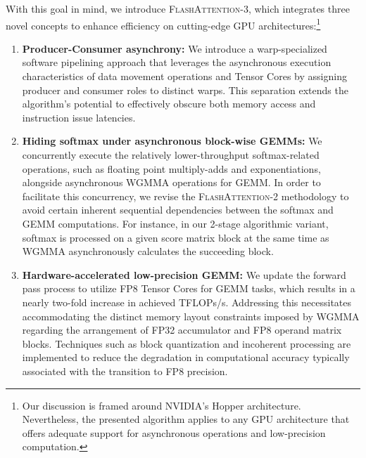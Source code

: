 With this goal in mind, we introduce \textsc{FlashAttention-3}, which integrates three novel concepts to enhance efficiency on cutting-edge GPU architectures:\footnote{Our discussion is framed around NVIDIA's Hopper architecture. Nevertheless, the presented algorithm applies to any GPU architecture that offers adequate support for asynchronous operations and low-precision computation.}

\begin{enumerate}

\item \textbf{Producer-Consumer asynchrony:} We introduce a warp-specialized software pipelining approach that leverages the asynchronous execution characteristics of data movement operations and Tensor Cores by assigning producer and consumer roles to distinct warps. This separation extends the algorithm’s potential to effectively obscure both memory access and instruction issue latencies.

\item \textbf{Hiding softmax under asynchronous block-wise GEMMs:} We concurrently execute the relatively lower-throughput softmax-related operations, such as floating point multiply-adds and exponentiations, alongside asynchronous WGMMA operations for GEMM. In order to facilitate this concurrency, we revise the \textsc{FlashAttention-2} methodology to avoid certain inherent sequential dependencies between the softmax and GEMM computations. For instance, in our 2-stage algorithmic variant, softmax is processed on a given score matrix block at the same time as WGMMA asynchronously calculates the succeeding block.

\item \textbf{Hardware-accelerated low-precision GEMM:} We update the forward pass process to utilize FP8 Tensor Cores for GEMM tasks, which results in a nearly two-fold increase in achieved TFLOPs/s. Addressing this necessitates accommodating the distinct memory layout constraints imposed by WGMMA regarding the arrangement of FP32 accumulator and FP8 operand matrix blocks. Techniques such as block quantization and incoherent processing are implemented to reduce the degradation in computational accuracy typically associated with the transition to FP8 precision.
\end{enumerate}

